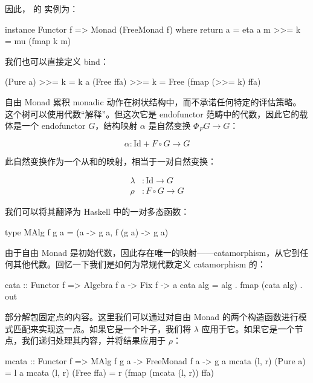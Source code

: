 \documentclass[DaoFP]{subfiles}
\begin{document}
    因此， 的  实例为：

    \begin{haskell}
        instance Functor f => Monad (FreeMonad f) where
        return a = eta a
        m >>= k = mu (fmap k m)
    \end{haskell}

    我们也可以直接定义 bind：

    \begin{haskell}
    (Pure a)   >>= k = k a
    (Free ffa) >>= k = Free (fmap (>>= k) ffa)
    \end{haskell}

    自由 Monad 累积 monadic 动作在树状结构中，而不承诺任何特定的评估策略。这个树可以使用代数“解释”。但这次它是 endofunctor 范畴中的代数，因此它的载体是一个 endofunctor $G$，结构映射 $\alpha$ 是自然变换 $\Phi_F G \to G$：

    \[ \alpha \colon \text{Id} + F \circ G \to G\]

    此自然变换作为一个从和的映射，相当于一对自然变换：

    \begin{align*}
        \lambda &\colon \text{Id} \to G
        \\
        \rho &\colon F \circ G \to G
    \end{align*}

    我们可以将其翻译为 Haskell 中的一对多态函数：

    \begin{haskell}
        type MAlg f g a = (a -> g a, f (g a) -> g a)
    \end{haskell}

    由于自由 Monad 是初始代数，因此存在唯一的映射——catamorphism，从它到任何其他代数。回忆一下我们是如何为常规代数定义 catamorphism 的：

    \begin{haskell}
        cata :: Functor f => Algebra f a -> Fix f -> a
        cata alg = alg . fmap (cata alg) . out
    \end{haskell}

     部分解包固定点的内容。这里我们可以通过对自由 Monad 的两个构造函数进行模式匹配来实现这一点。如果它是一个叶子，我们将 $\lambda$ 应用于它。如果它是一个节点，我们递归处理其内容，并将结果应用于 $\rho$：

    \begin{haskell}
        mcata :: Functor f => MAlg f g a -> FreeMonad f a -> g a
        mcata (l, r) (Pure a) = l a
        mcata (l, r) (Free ffa) =
        r (fmap (mcata (l, r)) ffa)
    \end{haskell}
\end{document}

